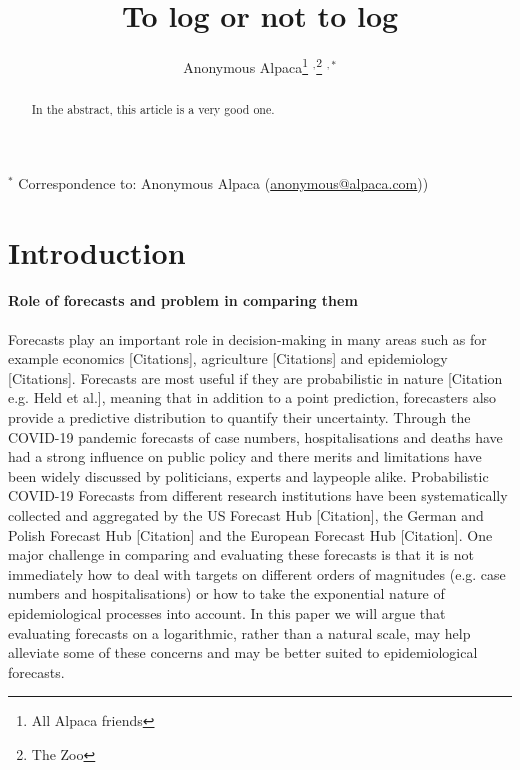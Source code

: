 \documentclass{article}
\begin{document}
\title{To log or not to log}
  \author{Anonymous Alpaca\thanks{All Alpaca friends} $^{,}$\thanks{The Zoo} $^{ , *}$}

\maketitle

\begin{abstract}
In the abstract, this article is a very good one. 
\end{abstract}

\bigskip

{\footnotesize $^*$ Correspondence to: Anonymous Alpaca (\url{anonymous@alpaca.com}))}



\newpage


\section{Introduction}

\paragraph{Role of forecasts and problem in comparing them}

Forecasts play an important role in decision-making in many areas such as for example economics [Citations], agriculture [Citations] and epidemiology [Citations]. Forecasts are most useful if they are probabilistic in nature [Citation e.g. Held et al.], meaning that in addition to a point prediction, forecasters also provide a predictive distribution to quantify their uncertainty. Through the COVID-19 pandemic forecasts of case numbers, hospitalisations and deaths have had a strong influence on public policy and there merits and limitations have been widely discussed by politicians, experts and laypeople alike. Probabilistic COVID-19 Forecasts from different research institutions have been systematically collected and aggregated by the US Forecast Hub [Citation], the German and Polish Forecast Hub [Citation] and the European Forecast Hub [Citation]. One major challenge in comparing and evaluating these forecasts is that it is not immediately how to deal with targets on different orders of magnitudes (e.g. case numbers and hospitalisations) or how to take the exponential nature of epidemiological processes into account. In this paper we will argue that evaluating forecasts on a logarithmic, rather than a natural scale, may help alleviate some of these concerns and may be better suited to epidemiological forecasts. 
\end{document}
